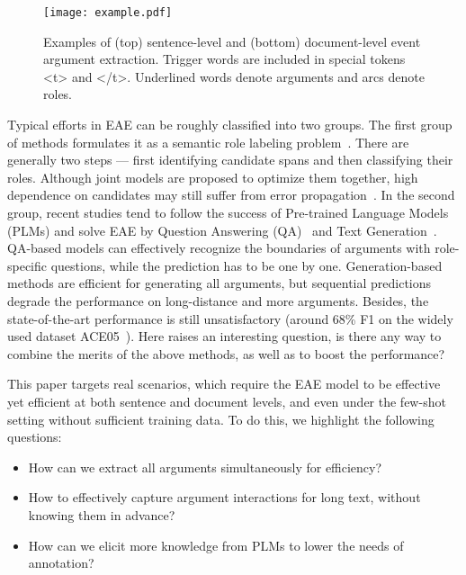 \begin{figure}[t]
\centering
\texttt{[image: example.pdf]}
\caption{Examples of (top) sentence-level and (bottom) document-level event argument extraction. Trigger words are included in special tokens <t> and </t>. Underlined words denote arguments and arcs denote roles.}
\label{fig: D-EAE task example}
\centering
\end{figure}

Typical efforts in EAE can be roughly classified into two groups. The first group of methods formulates it as a semantic role labeling problem~\cite{wei-etal-2021-trigger}. There are generally two steps --- first identifying candidate spans and then classifying their roles. Although joint models are proposed to optimize them together, high dependence on candidates may still suffer from error propagation~\cite{li-etal-2013-joint}. In the second group, recent studies tend to follow the success of Pre-trained Language Models (PLMs) and solve EAE by Question Answering (QA)~\cite{liu-etal-2021-machine, wei-etal-2021-trigger, du-cardie-2020-event, liu-etal-2020-event, li-etal-2020-event} and Text Generation~\cite{lu-etal-2021-text2event, li-etal-2021-document}. QA-based models can effectively recognize the boundaries of arguments with role-specific questions, while the prediction has to be one by one. 
Generation-based methods are efficient for generating all arguments, but sequential predictions degrade the performance on long-distance and more arguments. Besides, the state-of-the-art performance is still unsatisfactory (around 68\% F1 on the widely used dataset ACE05~\cite{doddington-etal-2004-automatic}). Here raises an interesting question, is there any way to combine the merits of the above methods, as well as to boost the performance?

This paper targets real scenarios, which require the EAE model to be effective yet efficient at both sentence and document levels, and even under the few-shot setting without sufficient training data. To do this, we highlight the following questions:

\begin{itemize}[leftmargin=*]
    \setlength{\parskip}{0pt}
   \setlength{\itemsep}{0pt plus 1pt}
    \item How can we extract all arguments simultaneously for efficiency?
    \item How to effectively capture argument interactions for long text, without knowing them in advance?
    \item How can we elicit more knowledge from PLMs to lower the needs of annotation?
\end{itemize}

